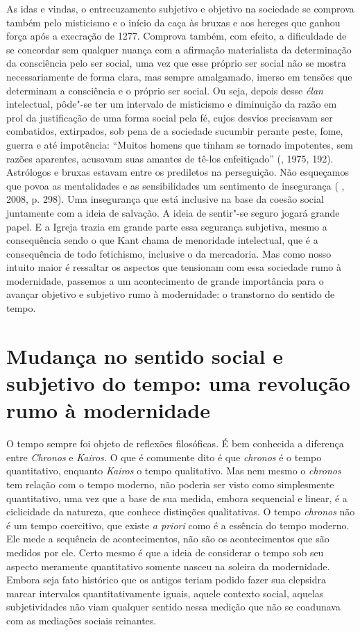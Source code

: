As idas e vindas, o entrecuzamento subjetivo e objetivo na sociedade se
comprova também pelo misticismo e o início da caça às bruxas e aos
hereges que ganhou força após a execração de 1277. Comprova também, com
efeito, a dificuldade de se concordar sem qualquer nuança com a
afirmação materialista da determinação da consciência pelo ser social,
uma vez que esse próprio ser social não se mostra necessariamente de
forma clara, mas sempre amalgamado, imerso em tensões que determinam a
consciência e o próprio ser social. Ou seja, depois desse \emph{élan}
intelectual, pôde"-se ter um intervalo de misticismo e diminuição da
razão em prol da justificação de uma forma social pela fé, cujos desvios
precisavam ser combatidos, extirpados, sob pena de a sociedade sucumbir
perante peste, fome, guerra e até impotência: ``Muitos homens que tinham
se tornado impotentes, sem razões aparentes, acusavam suas amantes de
tê-los enfeitiçado'' (, 1975, 192). Astrólogos e bruxas estavam
entre os prediletos na perseguição. Não esqueçamos que povoa as
mentalidades e as sensibilidades um sentimento de insegurança ( ,
2008, p. 298). Uma insegurança que está inclusive na base da coesão
social juntamente com a ideia de salvação. A ideia de sentir"-se seguro
jogará grande papel. E a Igreja trazia em grande parte essa segurança
subjetiva, mesmo a consequência sendo o que Kant chama de menoridade
intelectual, que é a consequência de todo fetichismo, inclusive o da
mercadoria. Mas como nosso intuito maior é ressaltar os aspectos que
tensionam com essa sociedade rumo à modernidade, passemos a um
acontecimento de grande importância para o avançar objetivo e subjetivo
rumo à modernidade: o transtorno do sentido de tempo.

\section{Mudança no sentido social e subjetivo do tempo: uma revolução rumo à modernidade}

O tempo sempre foi objeto de reflexões filosóficas. É bem conhecida a
diferença entre \emph{Chronos} e \emph{Kairos.} O que é comumente dito é
que \emph{chronos} é o tempo quantitativo, enquanto \emph{Kairos} o
tempo qualitativo. Mas nem mesmo o \emph{chronos} tem relação com o
tempo moderno, não poderia ser visto como simplesmente quantitativo, uma
vez que a base de sua medida, embora sequencial e linear, é a
ciclicidade da natureza, que conhece distinções qualitativas. O tempo
\emph{chronos} não é um tempo coercitivo, que existe \emph{a priori}
como é a essência do tempo moderno. Ele mede a sequência de
acontecimentos, não são os acontecimentos que são medidos por ele. Certo
mesmo é que a ideia de considerar o tempo sob seu aspecto meramente
quantitativo somente nasceu na soleira da modernidade. Embora seja fato
histórico que os antigos teriam podido fazer sua clepsidra marcar
intervalos quantitativamente iguais, aquele contexto social, aquelas
subjetividades não viam qualquer sentido nessa medição que não se
coadunava com as mediações sociais reinantes.

